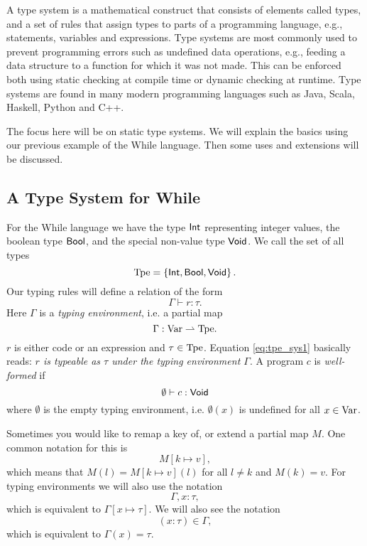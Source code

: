 A type system is a mathematical construct that consists of elements called
types, and a set of rules that assign types to parts of a programming language,
e.g., statements, variables and expressions. Type systems are most commonly used
to prevent programming errors such as undefined data operations, e.g., feeding a
data structure to a function for which it was not made. This can be enforced
both using static checking at compile time or dynamic checking at runtime. Type
systems are found in many modern programming languages such as Java, Scala,
Haskell, Python and C++.

The focus here will be on static type systems. We will explain the basics using
our previous example of the While language. Then some uses and extensions will be
discussed.

\subsection{A Type System for While}
\label{sub:a_type_system_for_while}

For the While language we have the type $\mbox{$\mathsf{Int}$}$ representing integer values,
the boolean type $\mbox{$\mathsf{Bool}$}$, and the special non-value type $\mbox{$\mathsf{Void}$}$.
We call the set of all types 
\begin{equation*}
  \mbox{$\mathrm{Tpe}$} = \left\{ \mbox{$\mathsf{Int}$}, \mbox{$\mathsf{Bool}$}, \mbox{$\mathsf{Void}$} \right\}.
\end{equation*}
Our typing rules will define a relation of the form
\begin{equation} \label{eq:tpe_sys1}
  \Gamma \vdash r : \tau.
\end{equation}
Here $\Gamma$ is a \emph{typing environment}, i.e. a partial map
\begin{equation*}
  \Gamma: \mbox{$\mathrm{Var}$} \rightharpoonup \mbox{$\mathrm{Tpe}$}.
\end{equation*}
$r$ is either code or an expression and $\tau \in \mbox{$\mathrm{Tpe}$}$.
Equation \eqref{eq:tpe_sys1} basically reads: {\it $r$ is typeable as $\tau$ under the
typing environment $\Gamma$}. A program $c$ is \emph{well-formed} if
\begin{equation*}
  \emptyset \vdash c : \mbox{$\mathsf{Void}$}
\end{equation*}
where $\emptyset$ is the empty typing environment, i.e. $\emptyset(x)$ is
undefined for all $x \in \mbox{$\mathrm{Var}$}$.

\begin{notation}
  Sometimes you would like to remap a key of, or extend a partial map $M$. One
  common notation
  for this is 
  \begin{equation*}
    M[k \mapsto v],
  \end{equation*}
  which means that $M(l) = M[k \mapsto v](l)$ for all $l \neq k$ and
  $M(k) = v$.
  For typing environments we will also use the notation
  \begin{equation*}
    \Gamma, x: \tau,
  \end{equation*}
  which is equivalent to $\Gamma[x \mapsto \tau]$. We will also see the notation
  \begin{equation*}
    (x: \tau) \in \Gamma,
  \end{equation*}
  which is equivalent to $\Gamma(x) = \tau$.
\end{notation}

